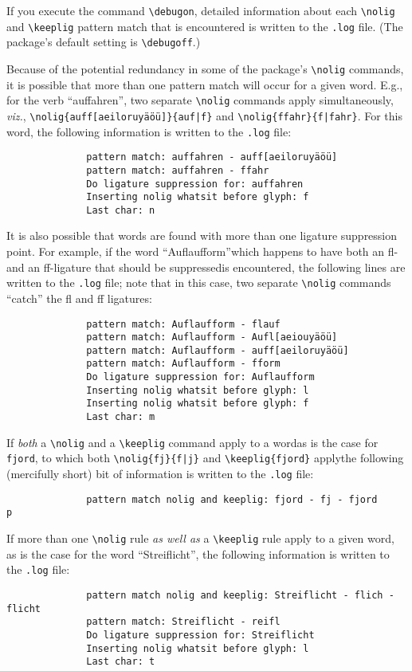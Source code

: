\documentclass[11pt]{article}
\newcommand{\opt}[1]{\texttt{#1}}
\newcommand{\cmmd}[1]{\texttt{\textbackslash #1}}
\begin{document}
If you execute the command \cmmd{debugon}, detailed information about each \cmmd{nolig} and \cmmd{keeplig} pattern match that is encountered is written to the \opt{.log} file. (The package's default setting is \cmmd{debugoff}.)

Because of the potential redundancy in some of the package's \cmmd{nolig} commands, it is possible that more than one pattern match will occur for a given word. E.g., for the verb \enquote{auffahren}, two separate \cmmd{nolig} commands apply simultaneously, \emph{viz.}, \Verb+\nolig{auff[aeiloruyäöü]}{auf|f}+ and \Verb+\nolig{ffahr}{f|fahr}+. For this word, the following information is written to the \opt{.log} file:
\begin{Verbatim}
              pattern match: auffahren - auff[aeiloruyäöü]
              pattern match: auffahren - ffahr
              Do ligature suppression for: auffahren
              Inserting nolig whatsit before glyph: f
              Last char: n
\end{Verbatim}

It is also possible that words are found with more than one ligature suppression point. For example, if the word \enquote{Auflaufform}\textemdash which happens to have both an fl- and an ff-ligature that should be suppressed\textemdash is encountered, the following lines are written to the \opt{.log} file; note that in this case, two separate \cmmd{nolig} commands \enquote{catch} the fl and ff ligatures:
\begin{Verbatim}
              pattern match: Auflaufform - flauf
              pattern match: Auflaufform - Aufl[aeiouyäöü]
              pattern match: Auflaufform - auff[aeiloruyäöü]
              pattern match: Auflaufform - fform
              Do ligature suppression for: Auflaufform
              Inserting nolig whatsit before glyph: l
              Inserting nolig whatsit before glyph: f
              Last char: m
\end{Verbatim}

If \emph{both} a \cmmd{nolig} and a \cmmd{keeplig} command apply to a word\textemdash as is the case for \opt{fjord}, to which both \Verb+\nolig{fj}{f|j}+ and \Verb+\keeplig{fjord}+ apply\textemdash the following (mercifully short) bit of information is written to the \opt{.log} file:
\begin{Verbatim}
              pattern match nolig and keeplig: fjord - fj - fjord
p\end{Verbatim}

If more than one \cmmd{nolig} rule \emph{as well as} a \cmmd{keeplig} rule apply to a given word, as is the case for the word \enquote{Streiflicht}, the following information is written to the \opt{.log} file:
\begin{Verbatim}
              pattern match nolig and keeplig: Streiflicht - flich - flicht
              pattern match: Streiflicht - reifl
              Do ligature suppression for: Streiflicht
              Inserting nolig whatsit before glyph: l
              Last char: t
              \end{Verbatim}
\end{document}
